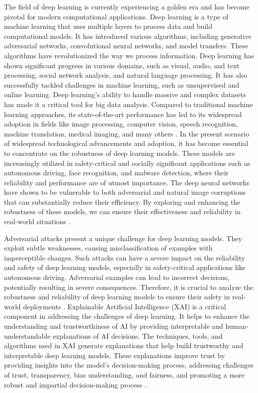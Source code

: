 \documentclass[10pt, conference, a4paper, final]{IEEEtran}
\begin{document}
The field of deep learning is currently experiencing a golden era and has become pivotal for modern computational applications. Deep learning is a type of machine learning that uses multiple layers to process data and build computational models. It has introduced various algorithms, including generative adversarial networks, convolutional neural networks, and model transfers. These algorithms have revolutionized the way we process information. Deep learning has shown significant progress in various domains, such as visual, audio, and text processing, social network analysis, and natural language processing. It has also successfully tackled challenges in machine learning, such as unsupervised and online learning. Deep learning's ability to handle massive and complex datasets has made it a critical tool for big data analysis. Compared to traditional machine learning approaches, its state-of-the-art performance has led to its widespread adoption in fields like image processing, computer vision, speech recognition, machine translation, medical imaging, and many others \cite {Saad, Md}. In the present scenario of widespread technological advancements and adoption, it has become essential to concentrate on the robustness of deep learning models. These models are increasingly utilized in safety-critical and socially significant applications such as autonomous driving, face recognition, and malware detection, where their reliability and performance are of utmost importance. The deep neural networks have shown to be vulnerable to both adversarial and natural image corruptions that can substantially reduce their efficiency. By exploring and enhancing the robustness of these models, we can ensure their effectiveness and reliability in real-world situations \cite {Numair, Aleksandar}.

Adversarial attacks present a unique challenge for deep learning models. They exploit subtle weaknesses, causing misclassification of examples with imperceptible changes. Such attacks can have a severe impact on the reliability and safety of deep learning models, especially in safety-critical applications like autonomous driving. Adversarial examples can lead to incorrect decisions, potentially resulting in severe consequences. Therefore, it is crucial to analyze the robustness and reliability of deep learning models to ensure their safety in real-world deployments \cite {Samuel, Muhammad}. 
Explainable Artificial Intelligence (XAI) is a critical component in addressing the challenges of deep learning. It helps to enhance the understanding and trustworthiness of AI by providing interpretable and human-understandable explanations of AI decisions. The techniques, tools, and algorithms used in XAI generate explanations that help build trustworthy and interpretable deep learning models. These explanations improve trust by providing insights into the model's decision-making process, addressing challenges of trust, transparency, bias understanding, and fairness, and promoting a more robust and impartial decision-making process \cite {Mohammed, Aha, Tamer}. 
\end{document}
